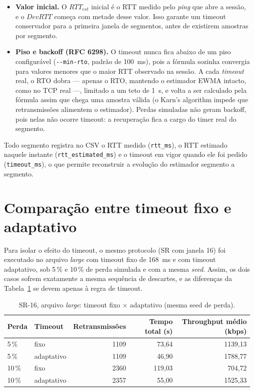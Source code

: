 \documentclass[11pt,a4paper]{article}
\begin{document}
\begin{itemize}
	\item \textbf{Valor inicial.} O $RTT_{est}$ inicial é o RTT medido pelo
		\textit{ping} que abre a sessão, e o $DevRTT$ começa com metade desse
		valor. Isso garante um timeout conservador para a primeira janela de
		segmentos, antes de existirem amostras por segmento.
	\item \textbf{Piso e backoff (RFC 6298).} O timeout nunca fica abaixo de um
		piso configurável (\texttt{-{}-min-rto}, padrão de \SI{100}{\milli\second}),
		pois a fórmula sozinha convergia para valores menores que o maior RTT
		observado na sessão. A cada \textit{timeout} real, o RTO dobra —
		apenas o RTO, mantendo o estimador EWMA intacto, como no TCP real —,
		limitado a um teto de \SI{1}{\second}, e volta a ser calculado pela
		fórmula assim que chega uma amostra válida (o Karn's algorithm impede
		que retransmissões alimentem o estimador). Perdas simuladas não geram
		backoff, pois nelas não ocorre timeout: a recuperação fica a cargo do
		timer real do segmento.
\end{itemize}

Todo segmento registra no CSV o RTT medido (\texttt{rtt\_ms}), o RTT estimado
naquele instante (\texttt{rtt\_estimated\_ms}) e o timeout em vigor quando ele foi
pedido (\texttt{timeout\_ms}), o que permite reconstruir a evolução do estimador
segmento a segmento.

\section{Comparação entre timeout fixo e adaptativo}
\label{sec:fixo_adapt}
Para isolar o efeito do timeout, o mesmo protocolo (SR com janela 16) foi
executado no arquivo \textit{large} com timeout fixo de \SI{168}{\milli\second} e
com timeout adaptativo, sob 5\,\% e 10\,\% de perda simulada e com a mesma
\textit{seed}. Assim, os dois casos sofrem exatamente a mesma sequência de
descartes, e as diferenças da Tabela~\ref{tab:fixo_adapt} se devem apenas à regra
de timeout.

\begin{table}[H]
\centering
\caption{SR-16, arquivo \textit{large}: timeout fixo $\times$ adaptativo (mesma seed de perda).}
\label{tab:fixo_adapt}
\small
\begin{tabular}{@{}llrrr@{}}
\toprule
Perda & Timeout & Retransmissões & Tempo total (s) & Throughput médio (kbps) \\
\midrule
5\,\%  & fixo       & 1109 & 73,64  & 1139,13 \\
5\,\%  & adaptativo & 1109 & 46,90  & 1788,77 \\
10\,\% & fixo       & 2360 & 119,03 & 704,72 \\
10\,\% & adaptativo & 2357 & 55,00  & 1525,33 \\
\bottomrule
\end{tabular}
\end{table}
\end{document}
